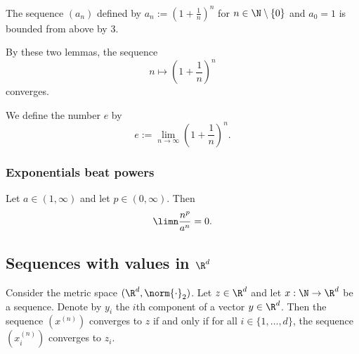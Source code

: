 \begin{lemma}
    The sequence $(a_n)$ defined by $a_n := \left(1 + \frac{1}{n}\right)^n$ for $n \in \N \setminus \{0\}$ and $a_0 = 1$ is bounded from above by 3.
\end{lemma}

By these two lemmas, the sequence
$$n \mapsto \left(1 + \frac{1}{n}\right)^n$$
converges.

\begin{definition}
    We define the number $e$ by
    $$e := \lim_{n\to\infty}\left(1 + \frac{1}{n}\right)^n.$$
\end{definition}

\subsubsection{Exponentials beat powers}
\begin{proposition}
    Let $a \in (1,\infty)$ and let $p \in (0,\infty)$. Then
    $$\limn\frac{n^p}{a^n} = 0.$$
\end{proposition}

\subsection{Sequences with values in \texorpdfstring{$\R^d$}{Rd}}
\begin{proposition}
    Consider the metric space $(\R^d, \norm{\cdot}_2)$. Let $z \in \R^d$ and let $x: \N \to \R^d$ be a sequence. Denote by $y_i$ the $i$th component of a vector $y \in \R^d$. Then the sequence $(x^{(n)})$ converges to $z$ if and only if for
    all $i \in \{1,\dots, d\}$, the sequence $(x_i^{(n)})$ converges to $z_i$.
\end{proposition}

